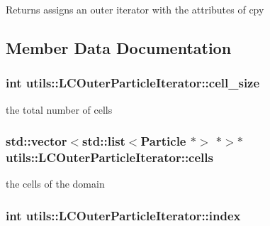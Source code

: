 \begin{DoxyReturn}{Returns}
assigns an outer iterator with the attributes of cpy 
\end{DoxyReturn}


\subsection{Member Data Documentation}
\hypertarget{classutils_1_1LCOuterParticleIterator_aa4df9b61c19d57586aa8a24433df3bb9}{
\subsubsection[{cell\-\_\-size}]{\setlength{\rightskip}{0pt plus 5cm}int utils\-::\-L\-C\-Outer\-Particle\-Iterator\-::cell\-\_\-size\hspace{0.3cm}{\ttfamily [private]}}}\label{classutils_1_1LCOuterParticleIterator_aa4df9b61c19d57586aa8a24433df3bb9}
the total number of cells \hypertarget{classutils_1_1LCOuterParticleIterator_a2a9cde56a9eab6ba0dad00cfad74ff01}{
\subsubsection[{cells}]{\setlength{\rightskip}{0pt plus 5cm}std\-::vector$<$std\-::list$<${\bf Particle} $\ast$$>$ $\ast$$>$$\ast$ utils\-::\-L\-C\-Outer\-Particle\-Iterator\-::cells\hspace{0.3cm}{\ttfamily [private]}}}\label{classutils_1_1LCOuterParticleIterator_a2a9cde56a9eab6ba0dad00cfad74ff01}
the cells of the domain \hypertarget{classutils_1_1LCOuterParticleIterator_a54059f42735afc424f37d05cb5a40a98}{
\subsubsection[{index}]{\setlength{\rightskip}{0pt plus 5cm}int utils\-::\-L\-C\-Outer\-Particle\-Iterator\-::index\hspace{0.3cm}{\ttfamily [private]}}}\label{classutils_1_1LCOuterParticleIterator_a54059f42735afc424f37d05cb5a40a98}
